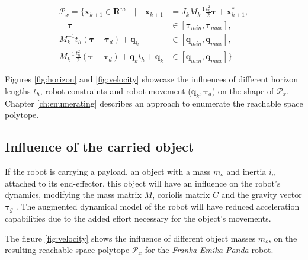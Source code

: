 
\begin{equation}
\begin{split}
    \mathcal{P}_x = \{ \bm{x}_{k+1} \in \mathbf{R}^m \quad| \quad \bm{x}_{k+1} &= J_k M_k^{-1}\frac{t_h^2}{2}\bm{\tau} + \bm{x}^*_{k+1},\\
    \quad \bm{\tau} &\in \left[\bm{\tau}_{min},\bm{\tau}_{max}\right],\\
   M_k^{-1}t_h (\bm{\tau} - \bm{\tau}_d) + \dot{\bm{q}}_{k} &\in \left[\dot{\bm{q}}_{min},\dot{\bm{q}}_{max}\right],\\
   M_k^{-1}\frac{t_h^2}{2}(\bm{\tau} - \bm{\tau}_d) +  \dot{\bm{q}}_{k}t_h + \bm{q}_{k} &\in \left[\bm{q}_{min},\bm{q}_{max}\right] \}
\end{split} 
\label{eq:polytope_simple}
\end{equation}

Figures \ref{fig:horizon} and \ref{fig:velocity} showcase the influences of different horizon lengths $t_h$, robot constraints and robot movement ($\dot{\bm{q}}_k,\bm{\tau}_d$) on the shape of $\mathcal{P}_x$. Chapter \ref{ch:enumerating} describes an approach to enumerate the reachable space polytope. 




\vspace{-0.3cm}
\subsection{Influence of the carried object}

If the robot is carrying a payload, an object with a mass $m_o$ and inertia $i_o$ attached to its end-effector, this object will have an influence on the robot's dynamics, modifying the mass matrix $M$, coriolis matrix $C$ and the gravity vector $\bm{\tau}_g$ \cite{hamad2019}.
The augmented dynamical model of the robot will have reduced acceleration capabilities due to the added effort necessary for the object's movements.

The figure \ref{fig:velocity} shows the influence of different object masses $m_o$, on the resulting reachable space polytope $\mathcal{P}_x$ for the \textit{Franka Emika Panda} robot. 

